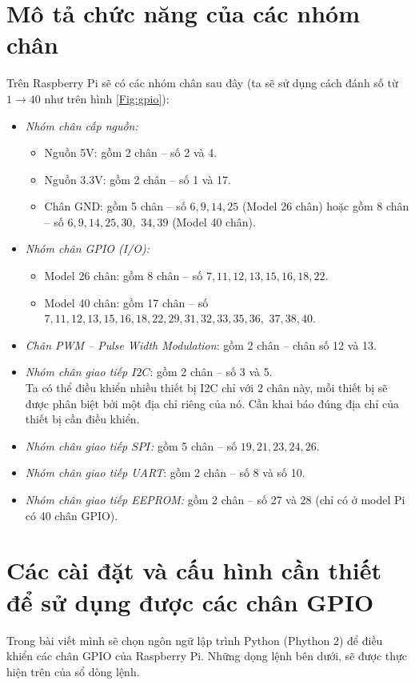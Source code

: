 \section{Mô tả chức năng của các nhóm chân}
Trên Raspberry Pi sẽ có các nhóm chân sau đây (ta sẽ sử dụng cách đánh số từ $1 \rightarrow 40$ như trên hình \ref{Fig:gpio}):
\begin{itemize}
\item \textit{Nhóm chân cấp nguồn:}
\begin{itemize}
\item Nguồn 5V: gồm 2 chân -- số 2 và 4.
\item Nguồn 3.3V: gồm 2 chân -- số 1 và 17.
\item Chân GND: gồm 5 chân -- số $6,9,14,25$ (Model 26 chân) hoặc gồm 8 chân -- số $6,9,14,25,30,$ $34,39$ (Model 40 chân).
\end{itemize}
\item \textit{Nhóm chân GPIO (I/O):}
\begin{itemize}
\item Model 26 chân: gồm 8 chân -- số $7, 11, 12, 13, 15, 16, 18, 22$.
\item Model 40 chân: gồm 17 chân -- số $7, 11, 12, 13, 15, 16, 18, 22, 29, 31, 32, 33, 35, 36,$ $37, 38, 40$.
\end{itemize}
\item \textit{Chân PWM -- Pulse Width Modulation}: gồm 2 chân -- chân số 12 và 13.
\item \textit{Nhóm chân giao tiếp $I2C$}: gồm 2 chân -- số 3 và 5.\\
Ta có thể điều khiển nhiều thiết bị I2C chỉ với 2 chân này, mỗi thiết bị sẽ được phân biệt bởi một địa chỉ riêng của nó. Cần khai báo đúng địa chỉ của thiết bị cần điều khiển.
\item \textit{Nhóm chân giao tiếp $SPI$:} gồm 5 chân -- số $19, 21, 23, 24, 26$.
\item \textit{Nhóm chân giao tiếp UART}: gồm 2 chân -- số 8 và số 10.
\item \textit{Nhóm chân giao tiếp EEPROM:} gồm 2 chân -- số 27 và 28 (chỉ có ở model Pi có 40 chân GPIO).
\end{itemize}
\section{Các cài đặt và cấu hình cần thiết để sử dụng được các chân GPIO}
Trong bài viết mình sẽ chọn ngôn ngữ lập trình Python (Phython 2) để điều khiển các chân GPIO của Raspberry Pi. Những dọng lệnh bên dưới, sẽ được thực hiện trên của sổ dòng lệnh.
